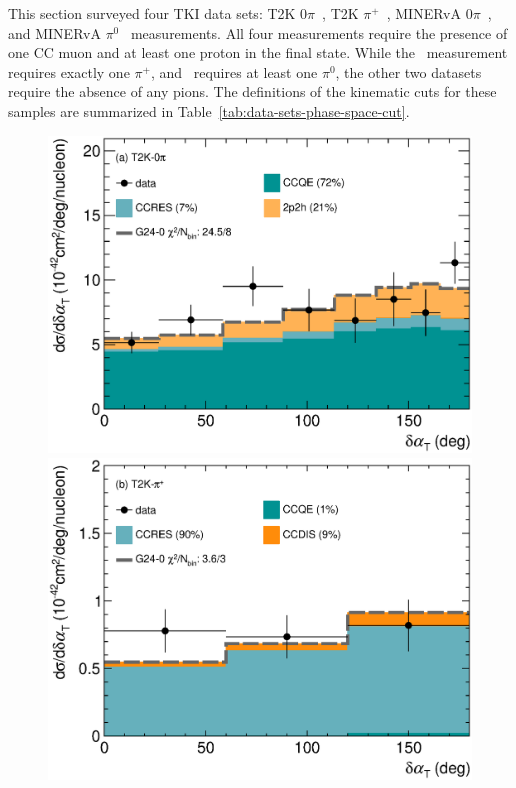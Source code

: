This section surveyed four TKI data sets: T2K $0\pi$~\cite{T2K:2018rnz}, T2K $\pi^+$~\cite{T2K:2021naz}, MINERvA $0\pi$~\cite{MINERvA:2018hba, MINERvA:2019ope}, and MINERvA $\pi^0$~\cite{MINERvA:2020anu} measurements. 
All four measurements require the presence of one CC muon and at least one proton in the final state. 
While the \ttkpip\ measurement requires exactly one $\pi^+$, and \minpiz\ requires at least one $\pi^0$, the other two datasets require the absence of any pions. 
The definitions of the kinematic cuts for these samples are summarized in Table~\ref{tab:data-sets-phase-space-cut}. 

\begin{figure} 
    \centering 		
    \includegraphics[width=\dbfigwid\textwidth]{figures/tuning/0000-t2k_0pi_dalphat_reac_decomp.eps} 
    \includegraphics[width=\dbfigwid\textwidth]{figures/tuning/0000-t2k_pip_dalphat_reac_decomp.eps} 

\end{figure}
